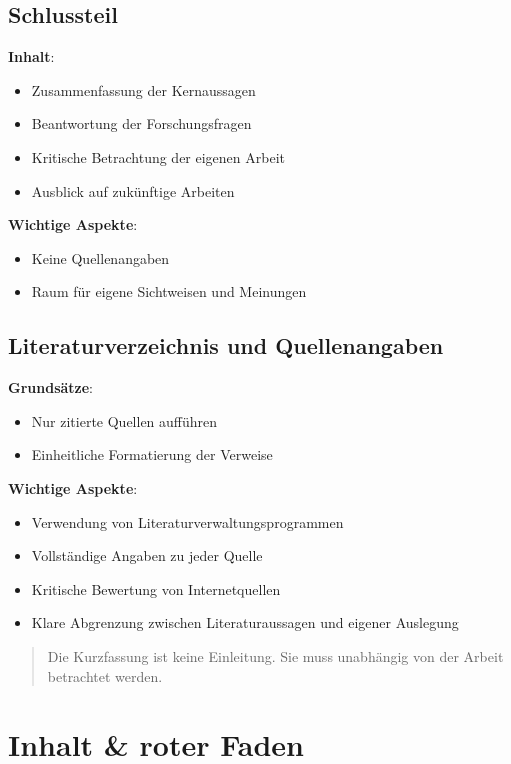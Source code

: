 \documentclass[12pt,a4paper,oneside]{article}
\begin{document}
\subsection{Schlussteil}
\textbf{Inhalt}:
\begin{itemize}
    \item Zusammenfassung der Kernaussagen
    \item Beantwortung der Forschungsfragen
    \item Kritische Betrachtung der eigenen Arbeit
    \item Ausblick auf zukünftige Arbeiten
\end{itemize}
\textbf{Wichtige Aspekte}:
\begin{itemize}
    \item Keine Quellenangaben
    \item Raum für eigene Sichtweisen und Meinungen
\end{itemize}

\subsection{Literaturverzeichnis und Quellenangaben}
\textbf{Grundsätze}:
\begin{itemize}
    \item Nur zitierte Quellen aufführen
    \item Einheitliche Formatierung der Verweise
\end{itemize}
\textbf{Wichtige Aspekte}:
\begin{itemize}
    \item Verwendung von Literaturverwaltungsprogrammen
    \item Vollständige Angaben zu jeder Quelle
    \item Kritische Bewertung von Internetquellen
    \item Klare Abgrenzung zwischen Literaturaussagen und eigener Auslegung
\end{itemize}

\begin{quote}
\glqq Die Kurzfassung ist keine Einleitung. Sie muss unabhängig von der Arbeit betrachtet werden.\grqq{}
\end{quote}

\section{Inhalt \& roter Faden}
\end{document}
